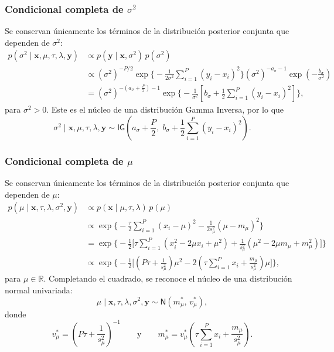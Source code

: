 \documentclass[11pt,a4paper]{article}
\begin{document}
\subsubsection*{Condicional completa de $\sigma^2$}

Se conservan únicamente los términos de la distribución posterior conjunta que dependen de $\sigma^2$:
\begin{align*}
p(\sigma^2 \mid \boldsymbol{x}, \mu, \tau, \lambda, \boldsymbol{y})
&\propto p(\boldsymbol{y} \mid \boldsymbol{x}, \sigma^2)\, p(\sigma^2) \\[6pt]
&\propto (\sigma^2)^{-P/2} \exp\Big\{ -\frac{1}{2\sigma^2}\sum_{i=1}^{P}(y_i - x_i)^2 \Big\} (\sigma^2)^{-a_\sigma - 1} \exp\left(-\frac{b_\sigma}{\sigma^2}\right) \\[6pt]
&= (\sigma^2)^{-\left(a_\sigma + \frac{P}{2}\right) - 1} \exp\Big\{ -\frac{1}{\sigma^2}\left[ b_\sigma + \frac{1}{2}\sum_{i=1}^{P}(y_i - x_i)^2 \right] \Big\},
\end{align*}
para $\sigma^2 > 0$. Este es el núcleo de una distribución Gamma Inversa, por lo que
\[
\sigma^2 \mid \boldsymbol{x}, \mu, \tau, \lambda, \boldsymbol{y} \sim \textsf{IG}\!\left( a_\sigma + \frac{P}{2}, \; b_\sigma + \frac{1}{2}\sum_{i=1}^{P}(y_i - x_i)^2 \right).
\]

\subsubsection*{Condicional completa de $\mu$}

Se conservan únicamente los términos de la distribución posterior conjunta que dependen de $\mu$:
\begin{align*}
p(\mu \mid \boldsymbol{x}, \tau, \lambda, \sigma^2, \boldsymbol{y})
&\propto p(\boldsymbol{x} \mid \mu, \tau, \lambda)\, p(\mu) \\[6pt]
&\propto \exp\Big\{ -\frac{\tau}{2}\sum_{i=1}^{P}(x_i - \mu)^2 - \frac{1}{2s_\mu^2}(\mu - m_\mu)^2 \Big\} \\[6pt]
&= \exp\Big\{ -\frac{1}{2}\Big[ \tau\sum_{i=1}^{P}(x_i^2 - 2\mu x_i + \mu^2) + \frac{1}{s_\mu^2}(\mu^2 - 2\mu m_\mu + m_\mu^2) \Big] \Big\} \\[6pt]
&\propto \exp\Big\{ -\frac{1}{2}\Big[ \left(P\tau + \frac{1}{s_\mu^2}\right)\mu^2 - 2\left(\tau\sum_{i=1}^{P}x_i + \frac{m_\mu}{s_\mu^2}\right)\mu \Big] \Big\},
\end{align*}
para $\mu \in \mathbb{R}$. Completando el cuadrado, se reconoce el núcleo de una distribución normal univariada:
\[
\mu \mid \boldsymbol{x}, \tau, \lambda, \sigma^2, \boldsymbol{y} \sim \textsf{N}\!\left( m_\mu^*, \, v_\mu^* \right),
\]
donde
\[
v_\mu^* = \left(P\tau + \frac{1}{s_\mu^2}\right)^{-1}
\qquad \text{y} \qquad
m_\mu^* = v_\mu^* \left(\tau\sum_{i=1}^{P}x_i + \frac{m_\mu}{s_\mu^2}\right).
\]
\end{document}
